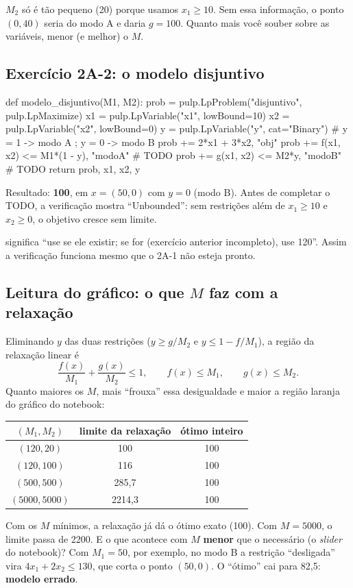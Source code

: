 \begin{atencao}
$M_2$ só é tão pequeno (20) porque usamos $x_1\ge10$. Sem essa informação, o ponto $(0,40)$ seria do modo A e daria
$g=100$. Quanto mais você souber sobre as variáveis, menor (e melhor) o $M$.
\end{atencao}

\subsection*{Exercício 2A-2: o modelo disjuntivo}

\begin{codigo}
def modelo_disjuntivo(M1, M2):
    prob = pulp.LpProblem("disjuntivo", pulp.LpMaximize)
    x1 = pulp.LpVariable("x1", lowBound=10)
    x2 = pulp.LpVariable("x2", lowBound=0)
    y  = pulp.LpVariable("y", cat="Binary")     # y = 1 -> modo A ; y = 0 -> modo B
    prob += 2*x1 + 3*x2, "obj"
    prob += f(x1, x2) <= M1*(1 - y), "modoA"    # TODO
    prob += g(x1, x2) <= M2*y,       "modoB"    # TODO
    return prob, x1, x2, y
\end{codigo}

Resultado: \textbf{100}, em $x=(50,0)$ com $y=0$ (modo B). Antes de completar o TODO, a verificação mostra
``Unbounded'': sem restrições além de $x_1\ge10$ e $x_2\ge0$, o objetivo cresce sem limite.

\begin{atencao}
 significa ``use  se ele existir; se for  (exercício anterior incompleto), use 120''.
Assim a verificação funciona mesmo que o 2A-1 não esteja pronto.
\end{atencao}

\subsection*{Leitura do gráfico: o que $M$ faz com a relaxação}

Eliminando $y$ das duas restrições ($y\ge g/M_2$ e $y\le1-f/M_1$), a região da relaxação linear é
\[
\frac{f(x)}{M_1}+\frac{g(x)}{M_2}\le 1,\qquad f(x)\le M_1,\qquad g(x)\le M_2 .
\]
Quanto maiores os $M$, mais ``frouxa'' essa desigualdade e maior a região laranja do gráfico do notebook:
\begin{center}
\begin{tabular}{ccc}
\toprule
$(M_1,M_2)$ & limite da relaxação & ótimo inteiro\\
\midrule
$(120,20)$ & 100 & 100\\
$(120,100)$ & 116 & 100\\
$(500,500)$ & 285,7 & 100\\
$(5000,5000)$ & 2214,3 & 100\\
\bottomrule
\end{tabular}
\end{center}
Com os $M$ mínimos, a relaxação já dá o ótimo exato (100). Com $M=5000$, o limite passa de 2200. E o que acontece com
$M$ \textbf{menor} que o necessário (o \emph{slider} do notebook)? Com $M_1=50$, por exemplo, no modo B a restrição
``desligada'' vira $4x_1+2x_2\le130$, que corta o ponto $(50,0)$. O ``ótimo'' cai para 82,5: \textbf{modelo errado}.

